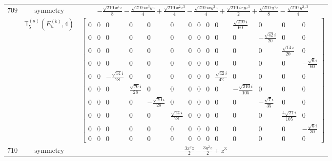 \documentclass[fleqn,8pt,landscape]{jsarticle}
\begin{document}
\begin{longtable}{ccc}
$ 709 $ & $ \text{symmetry} $ & $ - \frac{\sqrt{210} x^{4} z}{8} - \frac{\sqrt{210} i x^{3} y z}{4} + \frac{\sqrt{210} x^{2} z^{3}}{4} - \frac{\sqrt{210} i x y^{3} z}{4} + \frac{\sqrt{210} i x y z^{3}}{2} + \frac{\sqrt{210} y^{4} z}{8} - \frac{\sqrt{210} y^{2} z^{3}}{4} $ \\
$  $ & $ \mathbb{T}_{5}^{(a)}(E_{u}^{(b)},4) $ & $ \begin{bmatrix} 0 & 0 & 0 & 0 & 0 & 0 & 0 & 0 & 0 & 0 & \frac{\sqrt{210} i}{60} & 0 & 0 & 0 \\ 0 & 0 & 0 & 0 & 0 & 0 & 0 & 0 & 0 & 0 & 0 & - \frac{\sqrt{42} i}{20} & 0 & 0 \\ 0 & 0 & 0 & 0 & 0 & 0 & 0 & 0 & 0 & 0 & 0 & 0 & \frac{\sqrt{14} i}{20} & 0 \\ 0 & 0 & 0 & 0 & 0 & 0 & 0 & 0 & 0 & 0 & 0 & 0 & 0 & - \frac{\sqrt{6} i}{60} \\ 0 & 0 & - \frac{\sqrt{14} i}{28} & 0 & 0 & 0 & 0 & 0 & 0 & \frac{\sqrt{42} i}{42} & 0 & 0 & 0 & 0 \\ 0 & 0 & 0 & \frac{\sqrt{70} i}{28} & 0 & 0 & 0 & 0 & 0 & 0 & - \frac{\sqrt{210} i}{105} & 0 & 0 & 0 \\ 0 & 0 & 0 & 0 & - \frac{\sqrt{70} i}{28} & 0 & 0 & 0 & 0 & 0 & 0 & - \frac{\sqrt{7} i}{35} & 0 & 0 \\ 0 & 0 & 0 & 0 & 0 & \frac{\sqrt{14} i}{28} & 0 & 0 & 0 & 0 & 0 & 0 & \frac{4 \sqrt{21} i}{105} & 0 \\ 0 & 0 & 0 & 0 & 0 & 0 & 0 & 0 & 0 & 0 & 0 & 0 & 0 & - \frac{\sqrt{6} i}{30} \\ 0 & 0 & 0 & 0 & 0 & 0 & 0 & 0 & 0 & 0 & 0 & 0 & 0 & 0 \end{bmatrix} $ \\ \hline
$ 710 $ & $ \text{symmetry} $ & $ - \frac{3 x^{2} z}{2} - \frac{3 y^{2} z}{2} + z^{3} $ \\

\end{longtable}
\end{document}
